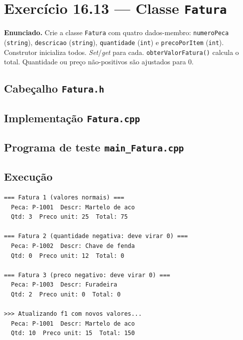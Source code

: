 \documentclass[11pt,a4paper]{article}
\begin{document}
\newpage
\section{Exerc\'icio 16.13 --- Classe \texttt{Fatura}}

\begin{enunciado}
\textbf{Enunciado.} Crie a classe \texttt{Fatura} com quatro dados-membro: \texttt{numeroPeca} (\texttt{string}), \texttt{descricao} (\texttt{string}), \texttt{quantidade} (\texttt{int}) e \texttt{precoPorItem} (\texttt{int}). Construtor inicializa todos. \emph{Set}/\emph{get} para cada. \texttt{obterValorFatura()} calcula o total. Quantidade ou pre\c{c}o n\~ao-positivos s\~ao ajustados para 0.
\end{enunciado}

\subsection*{Cabe\c{c}alho \texttt{Fatura.h}}



\subsection*{Implementa\c{c}\~ao \texttt{Fatura.cpp}}



\subsection*{Programa de teste \texttt{main\_Fatura.cpp}}



\subsection*{Execu\c{c}\~ao}

\begin{saidabox}
\begin{lstlisting}[style=terminal]
=== Fatura 1 (valores normais) ===
  Peca: P-1001  Descr: Martelo de aco
  Qtd: 3  Preco unit: 25  Total: 75

=== Fatura 2 (quantidade negativa: deve virar 0) ===
  Peca: P-1002  Descr: Chave de fenda
  Qtd: 0  Preco unit: 12  Total: 0

=== Fatura 3 (preco negativo: deve virar 0) ===
  Peca: P-1003  Descr: Furadeira
  Qtd: 2  Preco unit: 0  Total: 0

>>> Atualizando f1 com novos valores...
  Peca: P-1001  Descr: Martelo de aco
  Qtd: 10  Preco unit: 15  Total: 150
\end{lstlisting}
\end{saidabox}
\end{document}
